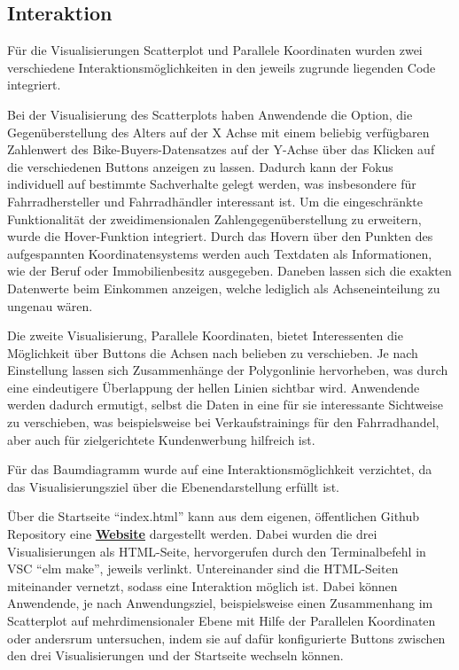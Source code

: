 \documentclass[usegeometry=true]{scrartcl}
\begin{document}
\subsection{Interaktion}
Für die Visualisierungen Scatterplot und Parallele Koordinaten wurden zwei verschiedene Interaktionsmöglichkeiten in den jeweils zugrunde liegenden Code integriert. 

Bei der Visualisierung des Scatterplots haben Anwendende die Option, die Gegenüberstellung des Alters auf der X Achse mit einem beliebig verfügbaren Zahlenwert des Bike-Buyers-Datensatzes auf der Y-Achse  über das Klicken auf die verschiedenen Buttons anzeigen zu lassen. Dadurch kann der Fokus individuell auf bestimmte Sachverhalte gelegt werden, was insbesondere für Fahrradhersteller und Fahrradhändler interessant ist. Um die eingeschränkte Funktionalität der zweidimensionalen Zahlengegenüberstellung zu erweitern, wurde die Hover-Funktion integriert. Durch das Hovern über den Punkten des aufgespannten Koordinatensystems werden auch Textdaten als Informationen, wie der Beruf oder Immobilienbesitz ausgegeben. Daneben lassen sich die exakten Datenwerte beim Einkommen anzeigen, welche lediglich als Achseneinteilung zu ungenau wären. 

Die zweite Visualisierung, Parallele Koordinaten, bietet Interessenten die Möglichkeit über Buttons die Achsen nach belieben zu verschieben. Je nach Einstellung lassen sich Zusammenhänge der Polygonlinie hervorheben, was durch eine eindeutigere Überlappung der hellen Linien sichtbar wird. Anwendende werden dadurch ermutigt, selbst die Daten in eine für sie interessante Sichtweise zu verschieben, was beispielsweise bei Verkaufstrainings für den Fahrradhandel, aber auch für zielgerichtete Kundenwerbung hilfreich ist. 

Für das Baumdiagramm wurde auf eine Interaktionsmöglichkeit verzichtet, da das Visualisierungsziel über die Ebenendarstellung erfüllt ist. 

Über die Startseite "`index.html"' kann aus dem eigenen, öffentlichen Github Repository eine \href{https://floeagle.github.io/Bike-Buyers-1000/index.html}{\textbf{Website}} dargestellt werden. Dabei wurden die drei Visualisierungen als HTML-Seite, hervorgerufen durch den Terminalbefehl in VSC "`elm make"', jeweils verlinkt. Untereinander sind die HTML-Seiten miteinander vernetzt, sodass eine Interaktion möglich ist. Dabei können Anwendende, je nach Anwendungsziel, beispielsweise einen Zusammenhang im Scatterplot auf mehrdimensionaler Ebene mit Hilfe der Parallelen Koordinaten oder andersrum untersuchen, indem sie auf dafür konfigurierte Buttons zwischen den drei Visualisierungen und der Startseite wechseln können.
\end{document}
